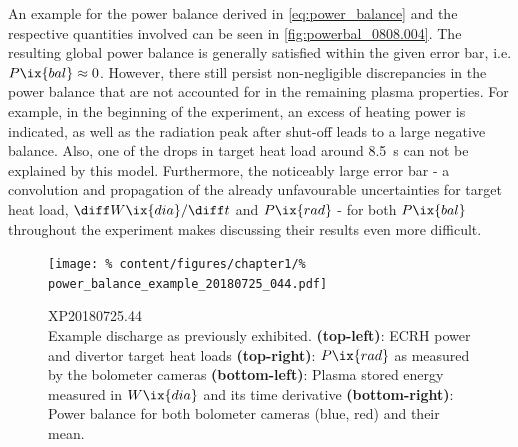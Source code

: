             An example for the power balance derived in \cref{eq:power_balance} and the respective quantities involved can be seen in \cref{fig:powerbal_0808.004}. The resulting global power balance is generally satisfied within the given error bar, i.e. $P\ix{bal}\approx 0$. However, there still persist non-negligible discrepancies in the power balance that are not accounted for in the remaining plasma properties. For example, in the beginning of the experiment, an excess of heating power is indicated, as well as the radiation peak after shut-off leads to a large negative balance. Also, one of the drops in target heat load around \SI{8.5}{\second} can not be explained by this model. Furthermore, the noticeably large error bar - a convolution and propagation of the already unfavourable uncertainties for target heat load, $\diff W\ix{dia}/\diff t$ and $P\ix{rad}$ - for both $P\ix{bal}$ throughout the experiment makes discussing their results even more difficult.\\%
%
            \begin{figure}[t]%
                \centering%
                \texttt{[image: \%
                    content/figures/chapter1/\%
                    power\_balance\_example\_20180725\_044.pdf]}%
                \caption{%
                    XP20180725.44\\%
                    Example discharge as previously exhibited. \textbf{(top-left)}: ECRH power and divertor target heat loads \textbf{(top-right)}: $P\ix{rad}$ as measured by the bolometer cameras \textbf{(bottom-left)}: Plasma stored energy measured in $W\ix{dia}$ and its time derivative \textbf{(bottom-right)}: Power balance for both bolometer cameras (blue, red) and their mean.}\label{fig:powerbal_0725.044}%
            \end{figure}%
%
